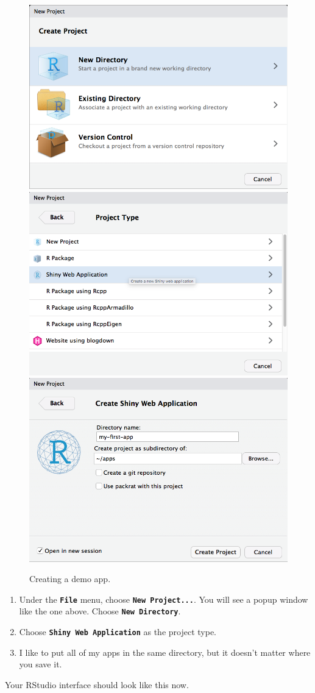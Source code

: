 \documentclass[
  oneside]{book}
\begin{document}
\begin{figure}

{\centering \includegraphics[width=0.3\linewidth]{images/demo_app/01-create-project} \includegraphics[width=0.3\linewidth]{images/demo_app/02-project-type} \includegraphics[width=0.3\linewidth]{images/demo_app/03-project-directory} 

}

\caption{Creating a demo app.}\label{fig:first-demo}
\end{figure}

\begin{enumerate}
\def\labelenumi{\arabic{enumi}.}
\item
  Under the \textbf{\texttt{File}} menu, choose \textbf{\texttt{New\ Project...}}. You will see a popup window like the one above. Choose \textbf{\texttt{New\ Directory}}.
\item
  Choose \textbf{\texttt{Shiny\ Web\ Application}} as the project type.
\item
  I like to put all of my apps in the same directory, but it doesn't matter where you save it.
\end{enumerate}

Your RStudio interface should look like this now.
\end{document}
